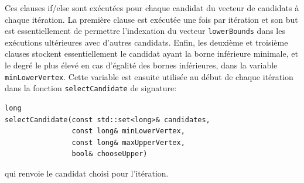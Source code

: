 \documentclass[11pt]{article}
\begin{document}
Ces clauses if/else sont exécutées pour chaque candidat du vecteur de candidats
à chaque itération. La première clause est exécutée une fois par itération et
son but est essentiellement de permettre l'indexation du vecteur
\texttt{lowerBounds} dans les exécutions ultérieures avec d'autres
candidats. Enfin, les deuxième et troisième clauses stockent essentiellement le
candidat ayant la borne inférieure minimale, et le degré le plus élevé en cas
d'égalité des bornes inférieures, dans la variable \texttt{minLowerVertex}.
Cette variable est ensuite utilisée au début de chaque itération dans la
fonction \texttt{selectCandidate} de signature:
\begin{verbatim}
long
selectCandidate(const std::set<long>& candidates,
                const long& minLowerVertex,
                const long& maxUpperVertex,
                bool& chooseUpper)
\end{verbatim}
qui renvoie le candidat choisi pour l'itération.
\end{document}
